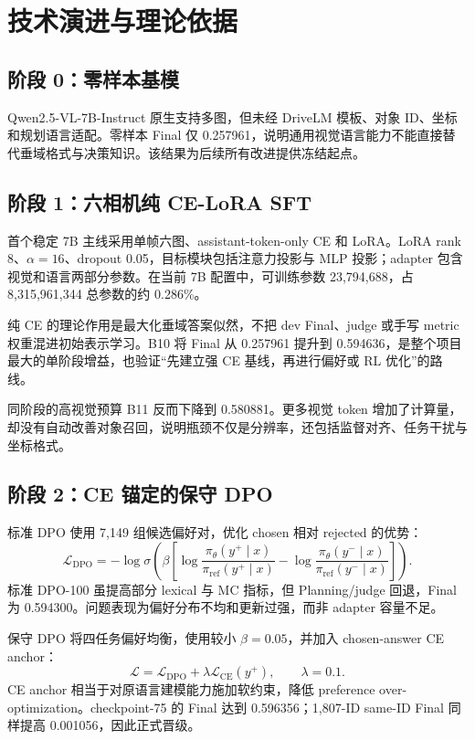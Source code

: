 \documentclass[UTF8,a4paper,11pt]{ctexart}
\begin{document}
\section{技术演进与理论依据}
\subsection{阶段 0：零样本基模}
Qwen2.5-VL-7B-Instruct 原生支持多图，但未经 DriveLM 模板、对象 ID、坐标和规划语言适配。零样本 Final 仅 0.257961，说明通用视觉语言能力不能直接替代垂域格式与决策知识。该结果为后续所有改进提供冻结起点。

\subsection{阶段 1：六相机纯 CE-LoRA SFT}
首个稳定 7B 主线采用单帧六图、assistant-token-only CE 和 LoRA。LoRA rank 8、\(\alpha=16\)、dropout 0.05，目标模块包括注意力投影与 MLP 投影；adapter 包含视觉和语言两部分参数。在当前 7B 配置中，可训练参数 23,794,688，占 8,315,961,344 总参数的约 0.286\%。

纯 CE 的理论作用是最大化垂域答案似然，不把 dev Final、judge 或手写 metric 权重混进初始表示学习。B10 将 Final 从 0.257961 提升到 0.594636，是整个项目最大的单阶段增益，也验证“先建立强 CE 基线，再进行偏好或 RL 优化”的路线。

同阶段的高视觉预算 B11 反而下降到 0.580881。更多视觉 token 增加了计算量，却没有自动改善对象召回，说明瓶颈不仅是分辨率，还包括监督对齐、任务干扰与坐标格式。

\subsection{阶段 2：CE 锚定的保守 DPO}
标准 DPO 使用 7,149 组候选偏好对，优化 chosen 相对 rejected 的优势：
\[
\mathcal L_{\mathrm{DPO}}
=-\log\sigma\!\left(
\beta\left[
\log\frac{\pi_\theta(y^+\mid x)}{\pi_{\mathrm{ref}}(y^+\mid x)}
-\log\frac{\pi_\theta(y^-\mid x)}{\pi_{\mathrm{ref}}(y^-\mid x)}
\right]\right).
\]
标准 DPO-100 虽提高部分 lexical 与 MC 指标，但 Planning/judge 回退，Final 为 0.594300。问题表现为偏好分布不均和更新过强，而非 adapter 容量不足。

保守 DPO 将四任务偏好均衡，使用较小 \(\beta=0.05\)，并加入 chosen-answer CE anchor：
\[
\mathcal L=\mathcal L_{\mathrm{DPO}}+\lambda\mathcal L_{\mathrm{CE}}(y^+),
\qquad \lambda=0.1.
\]
CE anchor 相当于对原语言建模能力施加软约束，降低 preference over-optimization。checkpoint-75 的 Final 达到 0.596356；1,807-ID same-ID Final 同样提高 0.001056，因此正式晋级。
\end{document}
